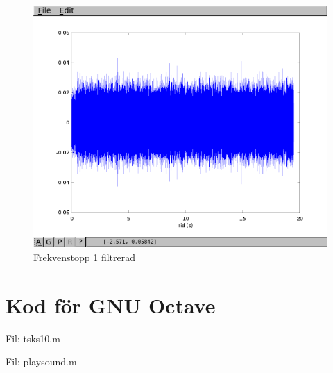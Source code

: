 \documentclass[a4paper,12pt,fleqn]{article}
\begin{document}
\begin{figure}[htp]
  \begin{center}
  \includegraphics[keepaspectratio=true,width=\linewidth]{topp3_filter.png}  %
  \end{center}
  \caption{Frekvenstopp 1 filtrerad} %
  \label{fig:topp3_filter}
\end{figure}

\newpage
\section{Kod för GNU Octave}

Fil: tsks10.m



\newpage

Fil: playsound.m


\end{document}
